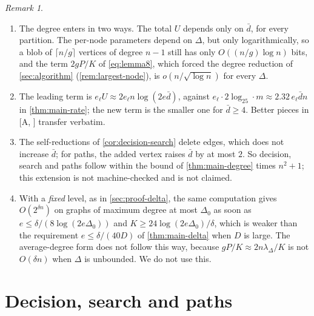 \documentclass[11pt]{amsart}
\theoremstyle{plain}
\theoremstyle{definition}
\theoremstyle{remark}
\newtheorem{remark}[theorem]{Remark}
\numberwithin{equation}{section}
\newcommand{\A}[1][]{\textup{[A\if\relax\detokenize{#1}\relax\else, #1\fi]}}
\begin{document}
\begin{remark}\label{rem:degree}
\leavevmode
\begin{enumerate}[label=(\alph*)]
\item The degree enters in two ways. The total $U$ depends only on $\bar d$, for every partition.
The per-node parameters depend on $\Delta$, but only logarithmically, so a blob of $\lceil n/g\rceil$
vertices of degree $n-1$ still has only $O((n/g)\log n)$ bits, and the term $2gP/K$ of
\eqref{eq:lemma8}, which forced the degree reduction of \cref{sec:algorithm}
(\cref{rem:largest-node}), is $o(n/\sqrt{\log n})$ for every $\Delta$.
\item The leading term is $e_\ell U\approx2e_\ell n\log(2e\bar d)$, against
$e_\ell\cdot2\log_25\cdot m\approx2.32\,e_\ell\bar dn$ in \cref{thm:main-rate}; the new term is the
smaller one for $\bar d\ge4$. Better pieces in \A{} transfer verbatim.
\item The self-reductions of \cref{cor:decision-search} delete edges, which does not increase
$\bar d$; for paths, the added vertex raises $\bar d$ by at most $2$. So decision, search and paths
follow within the bound of \cref{thm:main-degree} times $n^2+1$; this extension is not machine-checked and is not claimed.
\item With a \emph{fixed} level, as in \cref{sec:proof-delta}, the same computation gives
$O(2^{\delta n})$ on graphs of maximum degree at most $\Delta_0$ as soon as
$e\le\delta/(8\log(2e\Delta_0))$ and $K\ge24\log(2e\Delta_0)/\delta$, which is weaker than the
requirement $e\le\delta/(40D)$ of \cref{thm:main-delta} when $D$ is large. The average-degree form
does not follow this way, because $gP/K\approx2n\lambda_\Delta/K$ is not $O(\delta n)$ when
$\Delta$ is unbounded. We do not use this.
\end{enumerate}
\end{remark}

\section{Decision, search and paths}\label{sec:corollaries}
\end{document}
